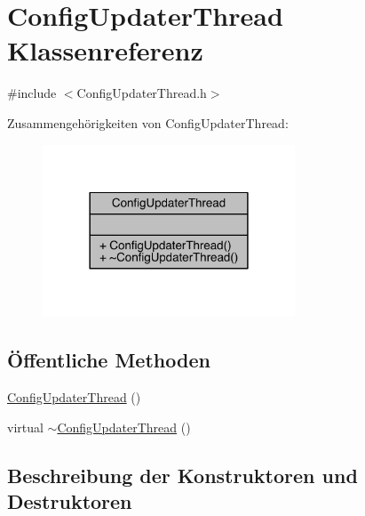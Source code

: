 \hypertarget{class_config_updater_thread}{}\section{Config\+Updater\+Thread Klassenreferenz}
\label{class_config_updater_thread}


{\ttfamily \#include $<$Config\+Updater\+Thread.\+h$>$}



Zusammengehörigkeiten von Config\+Updater\+Thread\+:\nopagebreak
\begin{figure}[H]
\begin{center}
\leavevmode
\includegraphics[width=213pt]{class_config_updater_thread__coll__graph}
\end{center}
\end{figure}
\subsection*{Öffentliche Methoden}
\begin{DoxyCompactItemize}
\item 
\hyperlink{class_config_updater_thread_a4ff1049db02d7dba1fff966487689fac}{Config\+Updater\+Thread} ()
\item 
virtual \hyperlink{class_config_updater_thread_a76b9050ee3e35fc85fd1b12eb2cb3ca4}{$\sim$\+Config\+Updater\+Thread} ()
\end{DoxyCompactItemize}


\subsection{Beschreibung der Konstruktoren und Destruktoren}
\hypertarget{class_config_updater_thread_a4ff1049db02d7dba1fff966487689fac}{}\label{class_config_updater_thread_a4ff1049db02d7dba1fff966487689fac} 
